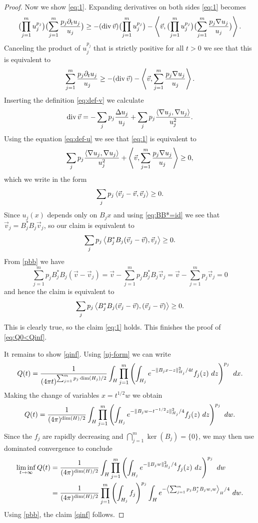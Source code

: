 \begin{proof}
Now we show \eqref{eq:1}.
Expanding derivatives on both sides \eqref{eq:1} becomes
\[
\bigl( \prod_{j=1}^m u_j^{p_j} \bigr) \bigl( \sum_{j=1}^{m} \frac{p_{j} \partial_{t} u_{j}}{u_{j}} \bigr)
\geq
- ( \operatorname{div} \vec v ) \bigl( \prod_{j=1}^m u_j^{p_j} \bigr) - \left\langle \vec v , \bigl( \prod_{j=1}^m u_j^{p_j} \bigr) \bigl( \sum_{j=1}^{m} \frac{p_{j} \nabla u_{j}}{u_{j}} \bigr) \right\rangle.
\]
Canceling the product of $u_{j}^{p_{j}}$ that is strictly positive for all $t>0$ we see that this is equivalent to
\[
\sum_{j=1}^{m} \frac{p_{j} \partial_{t} u_{j}}{u_{j}}
\geq
- ( \operatorname{div} \vec v ) - \left\langle \vec v , \sum_{j=1}^{m} \frac{p_{j} \nabla u_{j}}{u_{j}} \right\rangle.
\]
Inserting the definition \eqref{eq:def-v} we calculate
\[
\operatorname{div} \vec v = - \sum_{j} p_{j} \frac{\Delta u_{j}}{u_{j}} + \sum_{j} p_{j} \frac{\left\langle\nabla u_{j},\nabla u_{j}\right\rangle}{u_{j}^{2}}.
\]
Using the equation \eqref{eq:def-u} we see that \eqref{eq:1} is equivalent to
\[
\sum_{j} p_{j} \frac{\left\langle\nabla u_{j},\nabla u_{j}\right\rangle}{u_{j}^{2}} + \left\langle \vec v , \sum_{j=1}^{m} \frac{p_{j} \nabla u_{j}}{u_{j}} \right\rangle
\geq 0,
\]
which we write in the form
\[
\sum_{j} p_{j} \left\langle \vec{v}_{j} - \vec v, \vec{v}_{j} \right\rangle \geq 0.
\]
Since $u_{j}(x)$ depends only on $B_{j}x$ and using \eqref{eq:BB*=id} we see that $\vec{v}_{j} = B_{j}^{*}B_{j} \vec{v}_{j}$, so our claim is equivalent to
\[
\sum_{j} p_{j} \left\langle B_{j}^{*}B_{j} (\vec{v}_{j} - \vec v), \vec{v}_{j} \right\rangle \geq 0.
\]
From \eqref{pbb} we have
\[
\sum_{j=1}^m p_j B_j^{*}B_{j} (\vec v - \vec v_j) = \vec v - \sum_{j=1}^m p_j B_j^* B_j \vec v_j = \vec v - \sum_{j=1}^m p_j \vec v_j = 0
\]
and hence the claim is equivalent to
\[
\sum_{j} p_{j} \left\langle B_{j}^{*}B_{j} (\vec{v}_{j} - \vec v), (\vec{v}_{j} - \vec v) \right\rangle \geq 0.
\]
This is clearly true, so the claim \eqref{eq:1} holds.
This finishes the proof of \eqref{eq:Q0<Qinf}.

It remains to show \eqref{qinf}.
Using \eqref{uj-form} we can write
\[ Q(t) = \frac{1}{(4\pi t)^{\sum_{j=1}^m p_j \dim(H_j)/2}}
\int_{H} \prod_{j=1}^m \left(\int_{H_j} e^{- \lVert B_j x - z\rVert_{H_j}^2/4t} f_j(z)\ dz\right)^{p_j}\ dx.\]
Making the change of variables $x = t^{1/2} w$ we obtain
\[ Q(t) = \frac{1}{(4\pi)^{\dim(H)/2}}
\int_{H} \prod_{j=1}^m \left(\int_{H_j} e^{- \lVert B_j w - t^{-1/2} z\rVert_{H_j}^2/4} f_j(z)\ dz\right)^{p_j}\ dw.\]
Since the $f_j$ are rapidly decreasing and $\bigcap_{j=1}^m \ker(B_j) = \{0\}$, we may then use
dominated convergence to conclude
\begin{align*}
\liminf_{t \to \infty} Q(t) &=
\frac{1}{(4\pi)^{\dim(H)/2}}
\int_H \prod_{j=1}^m \left(\int_{H_j} e^{-\lVert B_j w \rVert_{H_j}^2/4} f_j(z)\ dz\right)^{p_j}\ dw \\
&=\frac{1}{(4\pi)^{\dim(H)/2}} \prod_{j=1}^m \left(\int_{H_j} f_j\right)^{p_j}
\int_{H} e^{-\left\langle \sum_{j=1}^m p_j B_j^* B_j w, w \right\rangle_H/4}\ dw.
\end{align*}
Using \eqref{pbb}, the claim \eqref{qinf} follows.
\end{proof}

